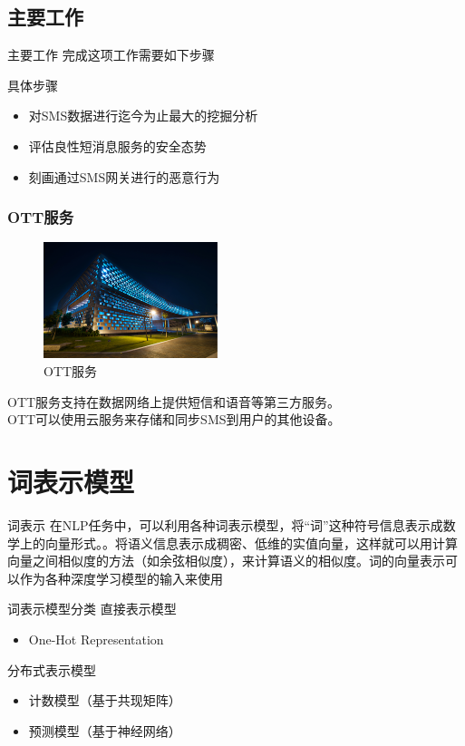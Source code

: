\documentclass[10pt,aspectratio=43,mathserif,table]{beamer}
\begin{document}
\subsection{主要工作}
\begin{frame}{主要工作}
完成这项工作需要如下步骤
\begin{block}{具体步骤}
\begin{itemize}
	\item<0->  对SMS数据进行迄今为止最大的挖掘分析
	\item<0->  评估良性短消息服务的安全态势
	\item<0->  刻画通过SMS网关进行的恶意行为
\end{itemize}
\end{block}
\end{frame}

 \begin{frame}
\frametitle{OTT服务}
\begin{figure}[!t]
	\centering
	\includegraphics[width=2in]{figures/sustech.pdf}
	\caption{OTT服务}
	\label{figure3_OTT}
\end{figure}
\begin{center}
	OTT服务支持在数据网络上提供短信和语音等第三方服务。\\
	OTT可以使用云服务来存储和同步SMS到用户的其他设备。
\end{center}

\end{frame}



\section{词表示模型}  %

\begin{frame}{词表示}
在NLP任务中，可以利用各种词表示模型，将“词”这种符号信息表示成数学上的向量形式。。将语义信息表示成稠密、低维的实值向量，这样就可以用计算向量之间相似度的方法（如余弦相似度），来计算语义的相似度。词的向量表示可以作为各种深度学习模型的输入来使用
\begin{block}{词表示模型分类}
	直接表示模型
	\begin{itemize}
		\item<0-> One-Hot Representation
	\end{itemize}
	
	分布式表示模型
	\begin{itemize}
		\item<0-> 计数模型（基于共现矩阵）
		\item<0-> 预测模型（基于神经网络）
	\end{itemize}
\end{block}
\end{frame}
\end{document}
